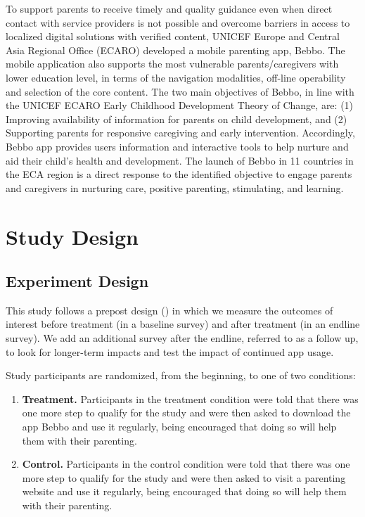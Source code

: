 \documentclass{article}
\begin{document}
To support parents to receive timely and quality guidance even when direct contact with service  providers is not possible and overcome barriers in access to localized digital solutions with verified  content, UNICEF Europe and Central Asia Regional Office (ECARO) developed a mobile parenting app,  Bebbo. The mobile application also supports the most vulnerable parents/caregivers with lower  education level, in terms of the navigation modalities, off-line operability and selection of the core  content. The two main objectives of Bebbo, in line with the UNICEF ECARO Early Childhood  Development Theory of Change, are: (1) Improving availability of information for parents on child  development, and (2) Supporting parents for responsive caregiving and early intervention.  Accordingly, Bebbo app provides users information and interactive tools to help nurture and aid their  child’s health and development. The launch of Bebbo in 11 countries in the ECA region is a direct  response to the identified objective to engage parents and caregivers in nurturing care, positive  parenting, stimulating, and learning.


\section*{Study Design}


\subsection*{Experiment Design}

This study follows a prepost design (\cite{Clifford2021}) in which we measure the outcomes of interest before treatment (in a baseline survey) and after treatment (in an endline survey). We add an additional survey after the endline, referred to as a follow up, to look for longer-term impacts and test the impact of continued app usage.

Study participants are randomized, from the beginning, to one of two conditions:

\begin{enumerate}
\item \textbf{Treatment.} Participants in the treatment condition were told that there was one more step to qualify for the study and were then asked to download the app Bebbo and use it regularly, being encouraged that doing so will help them with their parenting.
\item \textbf{Control.} Participants in the control condition were told that there was one more step to qualify for the study and were then asked to visit a parenting website and use it regularly, being encouraged that doing so will help them with their parenting.
\end{enumerate}
\end{document}
